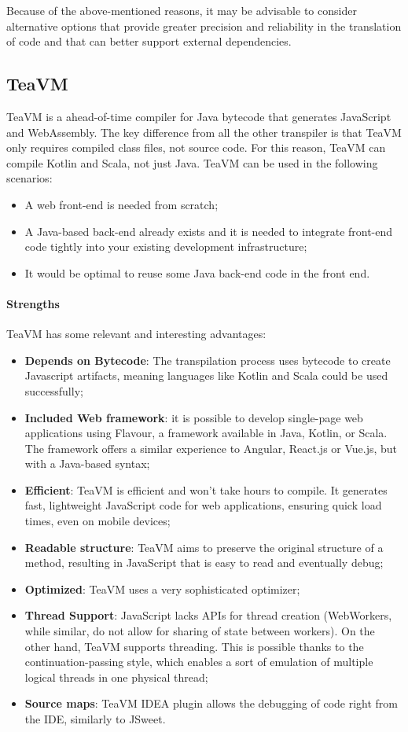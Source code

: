Because of the above-mentioned reasons, it may be advisable to consider alternative options that provide greater precision and reliability in the translation of code and that can better support external dependencies.

\subsection{TeaVM}
\label{ssec:teavm}
TeaVM is a ahead-of-time compiler for Java bytecode that generates JavaScript and WebAssembly. The key difference from all the other transpiler is that TeaVM only requires compiled class files, not source code. For this reason, TeaVM can compile Kotlin and Scala, not just Java. TeaVM can be used in the following scenarios:
\begin{itemize}
	\item A web front-end is needed from scratch;
	\item A Java-based back-end already exists and it is needed to integrate front-end code tightly into your existing development infrastructure;
	\item It would be optimal to reuse some Java back-end code in the front end.
\end{itemize}

\paragraph{Strengths} TeaVM has some relevant and interesting advantages:
\begin{itemize}
	\item \textbf{Depends on Bytecode}: The transpilation process uses bytecode to create Javascript artifacts, meaning languages like Kotlin and Scala could be used successfully;
	\item \textbf{Included Web framework}: it is possible to develop single-page web applications using Flavour, a framework available in Java, Kotlin, or Scala. The framework offers a similar experience to Angular, React.js or Vue.js, but with a Java-based syntax;
	\item \textbf{Efficient}: TeaVM is efficient and won't take hours to compile. It generates fast, lightweight JavaScript code for web applications, ensuring quick load times, even on mobile devices;
	\item \textbf{Readable structure}: TeaVM aims to preserve the original structure of a method, resulting in JavaScript that is easy to read and eventually debug;
	\item \textbf{Optimized}: TeaVM uses a very sophisticated optimizer;
	\item \textbf{Thread Support}: JavaScript lacks APIs for thread creation (WebWorkers, while similar, do not allow for sharing of state between workers). On the other hand, TeaVM supports threading. This is possible thanks to the continuation-passing style, which enables a sort of emulation of multiple logical threads in one physical thread;
	\item \textbf{Source maps}: TeaVM IDEA plugin allows the debugging of code right from the IDE, similarly to JSweet.
\end{itemize}
